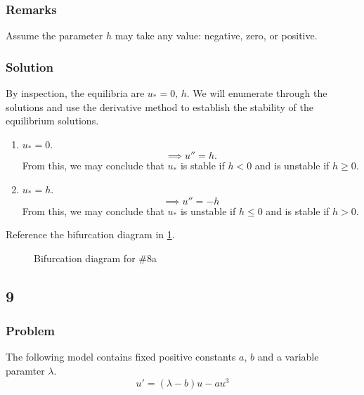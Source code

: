 \documentclass[12pt]{article}
\begin{document}
\subsubsection*{Remarks}
Assume the parameter $h$ may take any value: negative, zero, or positive.

\subsubsection*{Solution}
By inspection, the equilibria are $u_*=0,\,h$. We will enumerate through the
solutions and use the derivative method to establish the stability of the
equilibrium solutions.
\begin{enumerate}
\item $u_*=0$.
  $$\implies u''=h.$$ From this, we may conclude that $u_*$ is stable if $h<0$
  and is unstable if $h\ge0$.
\item $u_*=h$.
  $$\implies u''=-h$$ From this, we may conclude that $u_*$ is unstable if $h\le0$
  and is stable if $h>0$.
\end{enumerate}
Reference the bifurcation diagram in \cref{fig:8-bifurcation-diagram}.

\begin{figure}
  \centering
  \caption{Bifurcation diagram for \#8a}
  \label{fig:8-bifurcation-diagram}
\end{figure}

\subsection{9}
\subsubsection*{Problem}
The following model contains fixed positive constants $a$, $b$ and a variable paramter $\lambda$.
\begin{equation*}
  u'=(\lambda - b) u-au^3
\end{equation*}
\end{document}
